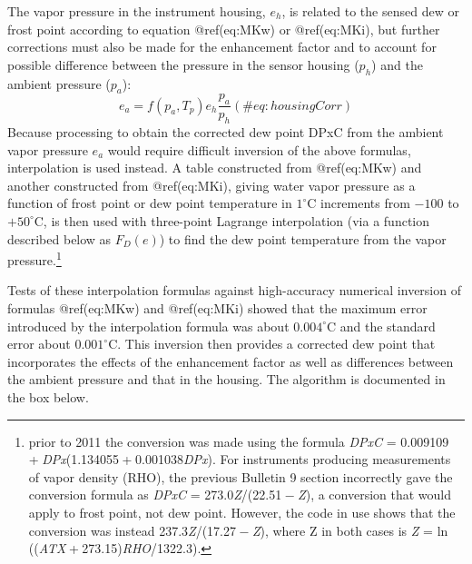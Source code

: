 \documentclass[
  english,
]{book}
\begin{document}
The vapor pressure in the instrument housing, \(e_h\), is related to the
sensed dew or frost point according to equation @ref(eq:MKw) or
@ref(eq:MKi), but further corrections must also be made for the
enhancement factor and to account for possible difference between the
pressure in the sensor housing (\(p_h\)) and the ambient pressure
(\(p_a\)):\\
\begin{equation}
e_{a}=f(p_{a},T_{p})e_{h}\frac{p_{a}}{p_{h}}
(\#eq:housingCorr)
\end{equation} Because processing to obtain the corrected dew point DPxC
from the ambient vapor pressure \(e_a\) would require difficult
inversion of the above formulas, interpolation is used instead. A table
constructed from @ref(eq:MKw) and another constructed from @ref(eq:MKi),
giving water vapor pressure as a function of frost point or dew point
temperature in \(1^\circ\mathrm{C}\) increments from \(-100\) to
\(+50^\circ\mathrm{C}\), is then used with three-point Lagrange
interpolation (via a function described below as \(F_D(e)\)) to find the
dew point temperature from the vapor pressure.\footnote{prior to 2011
  the conversion was made using the formula
  {\emph{DPxC} = 0.009109 + \emph{DPx}(1.134055 + 0.001038\emph{DPx})}.
  For instruments producing measurements of vapor density (RHO), the
  previous Bulletin 9 section incorrectly gave the conversion formula as
  {\emph{DPxC} = 273.0\emph{Z}/(22.51 − \emph{Z})}, a conversion that
  would apply to frost point, not dew point. However, the code in use
  shows that the conversion was instead
  {237.3\emph{Z}/(17.27 − \emph{Z})}, where Z in both cases is
  {\emph{Z} = ln ((\emph{ATX} + 273.15)\emph{RHO}/1322.3)}.}

Tests of these interpolation formulas against high-accuracy numerical
inversion of formulas @ref(eq:MKw) and @ref(eq:MKi) showed that the
maximum error introduced by the interpolation formula was about
\(0.004^\circ\mathrm{C}\) and the standard error about
\(0.001^\circ\mathrm{C}\). This inversion then provides a corrected dew
point that incorporates the effects of the enhancement factor as well as
differences between the ambient pressure and that in the housing. The
algorithm is documented in the box below.
\end{document}
